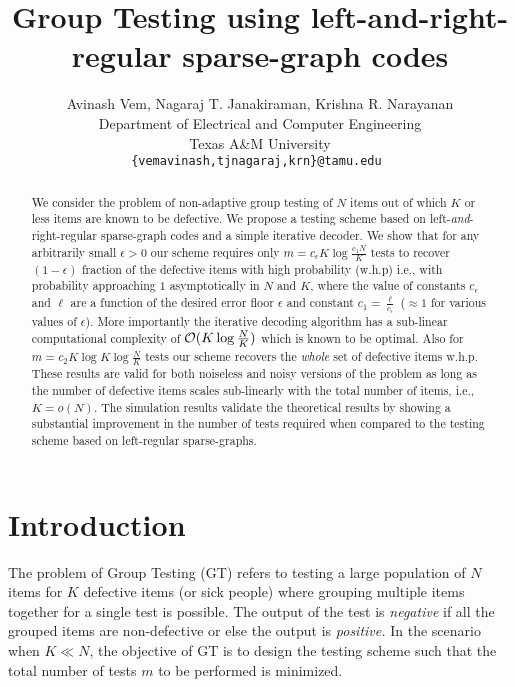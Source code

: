 \documentclass[conference,twocolumn]{IEEEtran}
\def\ceps{c_{\epsilon}}
\begin{document}
\title{Group Testing using left-and-right-regular sparse-graph codes}
\author{Avinash Vem, Nagaraj T. Janakiraman, Krishna R. Narayanan\\
Department of Electrical and Computer Engineering \\
Texas A\&M University\\
{\tt\small {\{vemavinash,tjnagaraj,krn\}@tamu.edu} }}

\maketitle
\begin{abstract}
We consider the problem of non-adaptive group testing of $N$ items out of which $K$ or less items are known to be defective. We propose a testing scheme based on left-{\em and}-right-regular sparse-graph codes and a simple iterative decoder. We show that for any arbitrarily small $\epsilon>0$ our scheme requires only $m=\ceps K\log \frac{c_1N}{K}$ tests to recover $(1-\epsilon)$ fraction of the defective items with high probability (w.h.p) i.e., with probability approaching $1$ asymptotically in $N$ and $K$, where the value of constants $\ceps$ and $\ell$ are a function of the desired error floor $\epsilon$ and constant $c_1=\frac{\ell}{\ceps}$ ($\approx 1$ for various values of $\epsilon$). More importantly the iterative decoding algorithm has a sub-linear computational complexity of $\mathcal{O}(K\log \frac{N}{K})$ which is known to be optimal. Also for $m=c_2 K\log K\log \frac{N}{K}$ tests our scheme recovers the \textit{whole} set of defective items w.h.p. These results are valid for both noiseless and noisy versions of the problem as long as the number of defective items scales sub-linearly with the total number of items, i.e., $K=o(N)$. The simulation results validate the theoretical results by showing a substantial improvement in the number of tests required when compared to the testing scheme based on left-regular sparse-graphs.
\end{abstract}

\section{Introduction}
The problem of Group Testing (GT) refers to testing a large population of $N$ items for $K$ defective items (or sick people) where grouping multiple items together for a single test is possible. The output of the test is \textit{negative} if all the grouped items are non-defective or else the output is \textit{positive.} In the scenario when $K \ll N$, the objective of GT is to design the testing scheme such that the total number of tests $m$ to be performed is minimized.
\end{document}
